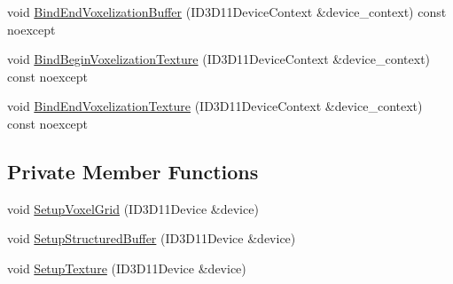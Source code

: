 \begin{DoxyCompactItemize}
\item 
void \hyperlink{classmage_1_1rendering_1_1_voxel_grid_a2da6ce7a6880b1fc65b36757d8111062}{Bind\+End\+Voxelization\+Buffer} (I\+D3\+D11\+Device\+Context \&device\+\_\+context) const noexcept
\item 
void \hyperlink{classmage_1_1rendering_1_1_voxel_grid_a00fa75aaed950df37be237c9b8557eeb}{Bind\+Begin\+Voxelization\+Texture} (I\+D3\+D11\+Device\+Context \&device\+\_\+context) const noexcept
\item 
void \hyperlink{classmage_1_1rendering_1_1_voxel_grid_ac404f5cb8fd1293e2351ae6106f37fe5}{Bind\+End\+Voxelization\+Texture} (I\+D3\+D11\+Device\+Context \&device\+\_\+context) const noexcept
\end{DoxyCompactItemize}
\subsection*{Private Member Functions}
\begin{DoxyCompactItemize}
\item 
void \hyperlink{classmage_1_1rendering_1_1_voxel_grid_af7796e22a1a02c50c77b2c8d40d800c0}{Setup\+Voxel\+Grid} (I\+D3\+D11\+Device \&device)
\item 
void \hyperlink{classmage_1_1rendering_1_1_voxel_grid_a8f24eca860d059316a1aa40f2e878ecc}{Setup\+Structured\+Buffer} (I\+D3\+D11\+Device \&device)
\item 
void \hyperlink{classmage_1_1rendering_1_1_voxel_grid_aa9b3ab18a4741ab9aa007965a43224eb}{Setup\+Texture} (I\+D3\+D11\+Device \&device)
\end{DoxyCompactItemize}
